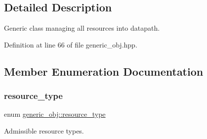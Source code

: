 \subsection{Detailed Description}
Generic class managing all resources into datapath. 

Definition at line 66 of file generic\+\_\+obj.\+hpp.



\subsection{Member Enumeration Documentation}
\mbox{\label{classgeneric__obj_a340b4a97256b423ea4a86bfdf201ec65}} 
\subsubsection{\texorpdfstring{resource\+\_\+type}{resource\_type}}
{\footnotesize\ttfamily enum \hyperlink{classgeneric__obj_a340b4a97256b423ea4a86bfdf201ec65}{generic\+\_\+obj\+::resource\+\_\+type}}



Admissible resource types. 

